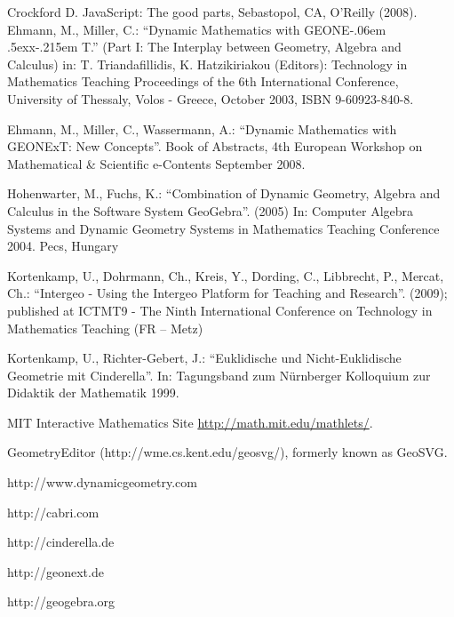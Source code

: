 \documentclass[12pt,a4paper]{article}%
\def\GEONExT{GEONE\kern-.06em \lower.5ex\hbox{x}\kern-.215em T}
\begin{document}
\begin{thebibliography}{99}
     Crockford D. JavaScript: The good parts, Sebastopol, CA, O'Reilly (2008).
     Ehmann, M., Miller, C.: ``Dynamic Mathematics with \GEONExT.''
        (Part I: The Interplay between Geometry, Algebra and Calculus)
        in: T. Triandafillidis, K. Hatzikiriakou (Editors): Technology in Mathematics Teaching
        Proceedings of the 6th International Conference, University of Thessaly, Volos - Greece, October 2003, ISBN 9-60923-840-8.    
 
     Ehmann, M., Miller, C., Wassermann, A.: ``Dynamic Mathematics with GEONExT: New Concepts''. Book of Abstracts, 4th European Workshop on Mathematical \& Scientific e-Contents
    September 2008.   

     Hohenwarter, M., Fuchs, K.: ``Combination of Dynamic Geometry, Algebra and Calculus in the Software System GeoGebra''. (2005) In: Computer Algebra Systems and Dynamic Geometry Systems in Mathematics Teaching Conference 2004. Pecs, Hungary 

     Kortenkamp, U., Dohrmann, Ch., Kreis, Y., Dording, C., Libbrecht, P., Mercat, Ch.: ``Intergeo - Using the Intergeo Platform for Teaching and Research''. (2009); published at ICTMT9 - The Ninth International Conference on Technology in Mathematics Teaching (FR – Metz)

     Kortenkamp, U., Richter-Gebert, J.: ``Euklidische und Nicht-Euklidische Geometrie mit Cinderella''. In: Tagungsband zum N\"{u}rnberger Kolloquium zur Didaktik der Mathematik 1999.
    
     MIT Interactive Mathematics Site {\href{http://math.mit.edu/mathlets/}{http://math.mit.edu/mathlets/}}.
    
     GeometryEditor (http://wme.cs.kent.edu/geosvg/), formerly known as GeoSVG.
    
    
     http://www.dynamicgeometry.com
    
     http://cabri.com 
    
     http://cinderella.de 
    
     http://geonext.de 
    
     http://geogebra.org
    

\end{thebibliography}
\end{document}
